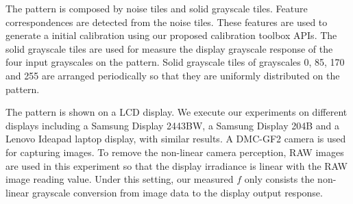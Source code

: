 \documentclass{report}
\begin{document}
The pattern is composed by noise tiles and solid grayscale tiles. Feature correspondences are detected from the noise tiles. These features are used to generate a initial calibration using our proposed calibration toolbox APIs. The solid grayscale tiles are used for measure the display grayscale response of the four input grayscales on the pattern. Solid grayscale tiles of grayscales 0, 85, 170 and 255 are arranged periodically so that they are uniformly distributed on the pattern. 

The pattern is shown on a LCD display. We execute our experiments on different displays including a Samsung Display 2443BW, a Samsung Display 204B and a Lenovo Ideapad laptop display, with similar results. A DMC-GF2 camera is used for capturing images. To remove the non-linear camera perception, RAW images are used in this experiment so that the display irradiance is linear with the RAW image reading value. Under this setting, our measured $f$ only consists the non-linear grayscale conversion from image data to the display output response. 
\end{document}
